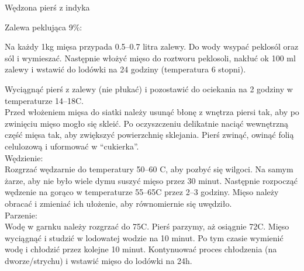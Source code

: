 \documentclass[a4paper,12pt]{article}
\begin{document}
\newpage

\begin{recipe}{Wędzona pierś z indyka}{}{}

\freeform%
Zalewa peklująca 9\%:

\freeform%
Na każdy 1kg mięsa przypada 0.5--0.7 litra zalewy.
Do wody wsypać peklosól oraz sól i wymieszać.
Następnie włożyć mięso do roztworu peklosoli, nakłuć ok 100 ml zalewy i wstawić do lodówki na 24 godziny (temperatura 6 stopni). 

Wyciągnąć pierś z zalewy (nie płukać) i pozostawić do ociekania na 2 godziny w temperaturze 14--18\0C. \\
Przed włożeniem mięsa do siatki należy usunąć błonę z wnętrza piersi tak, aby po zwinięciu mięso mogło się skleić. Po oczyszczeniu delikatnie naciąć wewnętrzną część mięsa tak, aby zwiększyć powierzchnię sklejania.
Pierś zwinąć, owinąć folią celulozową i uformować w ``cukierka''. \\

Wędzienie: \\
Rozgrzać wędzarnie do temperatury 50--60 \0C, aby pozbyć się wilgoci.
Na samym żarze, aby nie było wiele dymu suszyć mięso przez 30 minut.
Następnie rozpocząć wędzenie na gorąco w temperaturze 55--65\0C przez 2--3 godziny. 
Mięso należy obracać i zmieniać ich ułożenie, aby równomiernie się uwędziło. \\

Parzenie: \\
Wodę w garnku należy rozgrzać do 75\0C. Pierś parzymy, aż osiągnie 72\0C. 
Mięso wyciągnąć i studzić w lodowatej wodzie na 10 minut. Po tym czasie wymienić wodę i chłodzić przez kolejne 10 minut. Kontynuować proces chłodzenia (na dworze/strychu) i wstawić mięso do lodówki na 24h.

\end{recipe}

\newpage 
\end{document}
